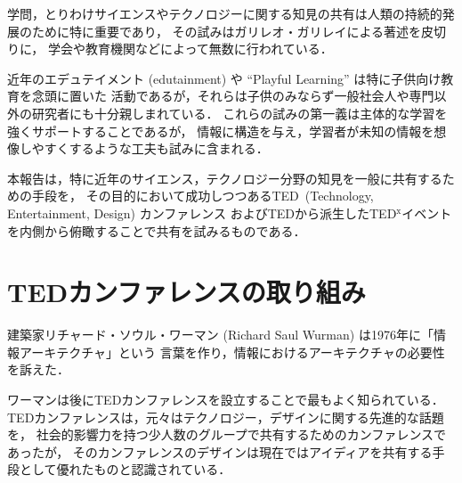 \documentclass[submit,techreq,jkeyword,noauthor]{ipsj}
\newcommand{\TED}{\textrm{TED}}
\newcommand{\TEDx}{\TED${}^{\textrm{x}}$}
\newcommand{\TEDtitle}{\textbf{TED}}
\begin{document}
学問，とりわけサイエンスやテクノロジーに関する知見の共有は人類の持続的発展のために特に重要であり，
その試みはガリレオ・ガリレイによる著述を皮切りに，
学会や教育機関などによって無数に行われている．\cite{gg}

近年のエデュテイメント (edutainment) や ``Playful Learning'' は特に子供向け教育を念頭に置いた
活動であるが，それらは子供のみならず一般社会人や専門以外の研究者にも十分親しまれている．
これらの試みの第一義は主体的な学習を強くサポートすることであるが，
情報に構造を与え，学習者が未知の情報を想像しやすくするような工夫も試みに含まれる．\cite{nu,mh}

本報告は，特に近年のサイエンス，テクノロジー分野の知見を一般に共有するための手段を，
その目的において成功しつつある\TED\ (Technology, Entertainment, Design) カンファレンス 
および\TED から派生した\TEDx イベントを内側から俯瞰することで共有を試みるものである．\cite{sugimoto}








\section{\TEDtitle カンファレンスの取り組み}

建築家リチャード・ソウル・ワーマン (Richard Saul Wurman) は1976年に「情報アーキテクチャ」という
言葉を作り，情報におけるアーキテクチャの必要性を訴えた．\cite{rsw}

ワーマンは後に\TED カンファレンスを設立することで最もよく知られている．
\TED カンファレンスは，元々はテクノロジー，デザインに関する先進的な話題を，
社会的影響力を持つ少人数のグループで共有するためのカンファレンスであったが，
そのカンファレンスのデザインは現在ではアイディアを共有する手段として優れたものと認識されている．\cite{historyofted}
\end{document}
